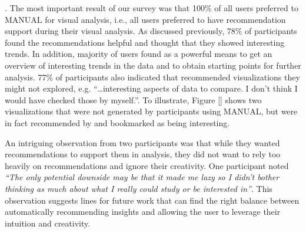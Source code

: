 . 
The most important result of our survey was that 100\% of all users preferred \SeeDB to MANUAL for
visual analysis, i.e., all users preferred to have recommendation support during their visual analysis.
As discussed previously, 78\% of participants found the recommendations helpful and thought that they
showed interesting trends.
In addition, majority of users found \SeeDB as a powerful means to get an overview of interesting trends
in the data and to obtain starting points for further analysis.
77\% of participants also indicated that \SeeDB recommended visualizations they might not explored, e.g.
``\ldots interesting aspects of data to compare. I don't think I would have checked those by myself.''.
To illustrate, Figure \ref{} shows two visualizations that were not generated by participants using MANUAL,
but were in fact recommended by \SeeDB and bookmarked as being interesting.

An intriguing observation from two participants was that while they wanted recommendations to support them
in analysis, they did not want to rely too heavily on recommendations and ignore their creativity.
One participant noted {\em ``The only potential downside may be that it made 
me lazy so I didn't bother thinking as much about what I really could study or be interested in''}.
This observation suggests lines for future work that can find the right balance between automatically 
recommending insights and allowing the user to leverage their intuition and creativity.

